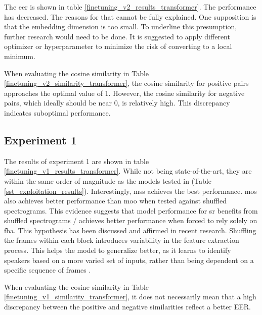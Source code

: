 The \gls{eer} is shown in table \ref{finetuning_v2_results_transformer}. The performance has decreased. The reasons for that cannot be fully explained. One supposition is that the embedding dimension is too small. To underline this presumption, further research would need to be done. It is suggested to apply different optimizer or hyperparameter to minimize the risk of converting to a local minimum.

When evaluating the cosine similarity in Table \ref{finetuning_v2_similarity_transformer}, the cosine similarity for positive pairs approaches the optimal value of 1. However, the cosine similarity for negative pairs, which ideally should be near 0, is relatively high. This discrepancy indicates suboptimal performance.


\subsection{Experiment 1}

The results of experiment 1 are shown in table \ref{finetuning_v1_results_transformer}. While not being state-of-the-art, they are within the same order of magnitude as the models tested in \cite{neururer2023deep} (Table \ref{sst_exploitation_results}). Interestingly, \gls{mss} achieves the best performance. \gls{mos} also achieves better performance than \gls{moo} when tested against shuffled spectrograms. This evidence suggests that model performance for \gls{sr} benefits from shuffled spectrograms / achieves better performance when forced to rely solely on \gls{fba}. This hypothesis has been discussed and affirmed in recent research. Shuffling the frames within each block introduces variability in the feature extraction process. This helps the model to generalize better, as it learns to identify speakers based on a more varied set of inputs, rather than being dependent on a specific sequence of frames \cite{barhoush_2021shuffledMFCC}. 

When evaluating the cosine similarity in Table \ref{finetuning_v1_similarity_transformer}, it does not necessarily mean that a high discrepancy between the positive and negative similarities reflect a better EER.

